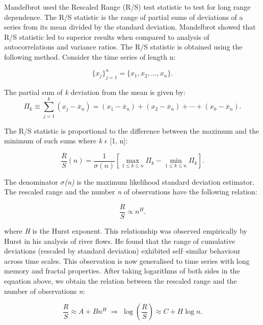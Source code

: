 \documentclass[12pt,a4paper]{report}
\numberwithin{equation}{section}
\begin{document}
Mandelbrot used the Rescaled Range (R/S) test statistic to test for long
range dependence. The R/S statistic is the range of partial sums of
deviations of a series from its mean divided by the standard deviation.
Mandelbrot showed that R/S statistic led to superior results when
compared to analysis of autocorrelations and variance ratios. The R/S
statistic is obtained using the following method. Consider the time
series of length n:

\begin{equation}
\{x_j\}_{j=1}^{n} = \{x_1, x_2, \ldots, x_n\}.
\label{eq:sequence-ch3}
\end{equation}

The partial sum of \emph{k} deviation from the mean is given by:
\begin{equation}
\Pi_{k} \equiv \sum_{j=1}^{k}\left(x_{j}-\overline{x}_{n}\right)
= (x_{1}-\overline{x}_{n}) + (x_{2}-\overline{x}_{n}) + \cdots + (x_{k}-\overline{x}_{n}).
\label{eq:Pi_k-ch3}
\end{equation}


The R/S statistic is proportional to the difference between the maximum
and the minimum of such sums where \emph{k} $\epsilon$ {[}1, n{]}:

\begin{equation}
\frac{R}{S}(n)=\frac{1}{\sigma(n)}
\left[\max_{1\le k\le n}\Pi_k-\min_{1\le k\le n}\Pi_k\right].
\label{eq:RS_n-ch3}
\end{equation}

The denominator \emph{$\sigma$(n)} is the maximum likelihood standard deviation
estimator. The rescaled range and the number \emph{n} of observations
have the following relation:

\begin{equation}
\frac{R}{S} \propto n^{H}.
\label{eq:RS_scaling-ch3}
\end{equation}


where \emph{H} is the Hurst exponent. This relationship was observed
empirically by Hurst in his analysis of river flows. He found that the
range of cumulative deviations (rescaled by standard deviation)
exhibited self--similar behaviour across time scales. This observation is
now generalised to time series with long memory and fractal properties.
After taking logarithms of both sides in the equation above, we obtain the
relation between the rescaled range and the number of observations
\emph{n}:

\begin{equation}
\frac{R}{S} \approx A + B n^{H}
\;\Rightarrow\;
\log\!\left(\frac{R}{S}\right) \approx C + H \log n .
\label{eq:RS_log_linear-ch3}
\end{equation}
\end{document}
